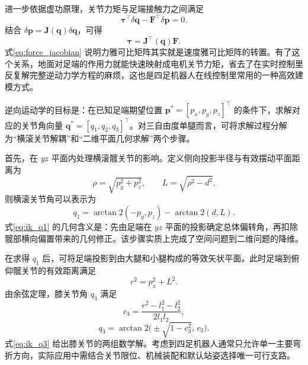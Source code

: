 \documentclass[12pt,a4paper]{ctexart}
\numberwithin{equation}{section}
\numberwithin{table}{section}
\numberwithin{figure}{section}
\newcommand{\subtopic}[1]{\par\addvspace{0.2\baselineskip}\ignorespaces}
\begin{document}
进一步依据虚功原理，关节力矩与足端接触力之间满足
\begin{equation}
\bm{\tau}^\top\delta \bm{q}-\bm{F}^\top\delta \bm{p}=0.
\end{equation}
结合 $\delta\bm{p}=\bm{J}(\bm{q})\delta\bm{q}$，可得
\begin{equation}
\bm{\tau}=\bm{J}^\top(\bm{q})\bm{F}.
\label{eq:force_jacobian}
\end{equation}
式\eqref{eq:force_jacobian} 说明力雅可比矩阵其实就是速度雅可比矩阵的转置。有了这个关系，地面对足端的作用力就能快速映射成电机关节力矩，省去了在实时控制里反复解完整逆动力学方程的麻烦，这也是四足机器人在线控制里常用的一种高效建模方式。

\subtopic{逆运动学分析}
逆向运动学的目标是：在已知足端期望位置 $\bm{p}^\ast=[p_x,p_y,p_z]^\top$ 的条件下，求解对应的关节角向量 $\bm{q}^\ast=[q_1,q_2,q_3]^\top$。对三自由度单腿而言，可将求解过程分解为“横滚关节解耦”和“二维平面几何求解”两个步骤。

首先，在 $yz$ 平面内处理横滚髋关节的影响。定义侧向投影半径与有效摆动平面距离为
\begin{equation}
\rho=\sqrt{p_y^2+p_z^2},\qquad L=\sqrt{\rho^2-d^2}.
\end{equation}
则横滚关节角可以表示为
\begin{equation}
q_1=\arctan2(-p_y,p_z)-\arctan2(d,L).
\label{eq:ik_q1}
\end{equation}
式\eqref{eq:ik_q1} 的几何含义是：先由足端在 $yz$ 平面的投影确定总体偏转角，再扣除髋部横向偏置带来的几何修正。该步骤实质上完成了空间问题到二维问题的降维。

在求得 $q_1$ 后，可将足端投影到由大腿和小腿构成的等效矢状平面。此时足端到俯仰髋关节的有效距离满足
\begin{equation}
r^2=p_x^2+L^2.
\end{equation}
由余弦定理，膝关节角 $q_3$ 满足
\begin{equation}
c_3=\frac{r^2-l_1^2-l_2^2}{2l_1l_2},
\end{equation}
\begin{equation}
q_3=\arctan2\bigl(\pm\sqrt{1-c_3^2},\,c_3\bigr).
\label{eq:ik_q3}
\end{equation}
式\eqref{eq:ik_q3} 给出膝关节的两组数学解。考虑到四足机器人通常只允许单一主要弯折方向，实际应用中需结合关节限位、机械装配和默认站姿选择唯一可行支路。
\end{document}

